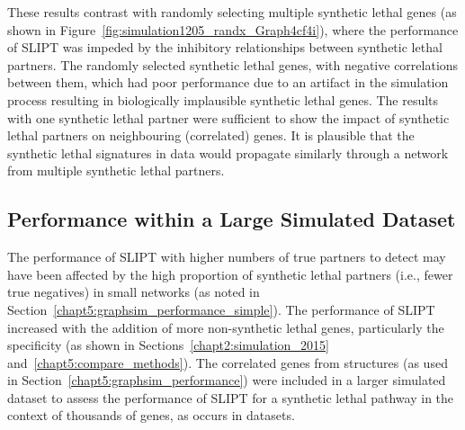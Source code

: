 These results contrast with randomly selecting multiple \gls{synthetic lethal} genes (as shown in Figure~\ref{fig:simulation1205_randx_Graph4cf4i}), where the performance of \gls{SLIPT} was impeded by the inhibitory relationships between \gls{synthetic lethal} partners. The randomly selected \gls{synthetic lethal} genes, with negative correlations between them, which had poor performance due to an artifact in the simulation process resulting in biologically implausible \gls{synthetic lethal} genes.
%
The results with one \gls{synthetic lethal} partner were sufficient to show the impact of \gls{synthetic lethal} partners on neighbouring (correlated) genes. It is plausible that the \gls{synthetic lethal} signatures in  data would propagate similarly through a network from multiple \gls{synthetic lethal} partners. %

\FloatBarrier

\subsection{Performance within a Large Simulated Dataset}
\label{chapt5:graphsim_performance_20K}

\FloatBarrier

The performance of \gls{SLIPT} with higher numbers of true partners to detect may have been affected by the high proportion of \gls{synthetic lethal} partners (i.e., fewer true negatives) in small networks (as noted in Section~\ref{chapt5:graphsim_performance_simple}). 
The performance of \gls{SLIPT} increased with the addition of more non-synthetic lethal genes, particularly the specificity (as shown in Sections~\ref{chapt2:simulation_2015} and~\ref{chapt5:compare_methods}). 
The correlated genes from  structures (as used in Section~\ref{chapt5:graphsim_performance}) were included in a larger simulated dataset to assess the performance of \gls{SLIPT} for a \gls{synthetic lethal} pathway in the context of thousands of genes, as occurs in  datasets. 

